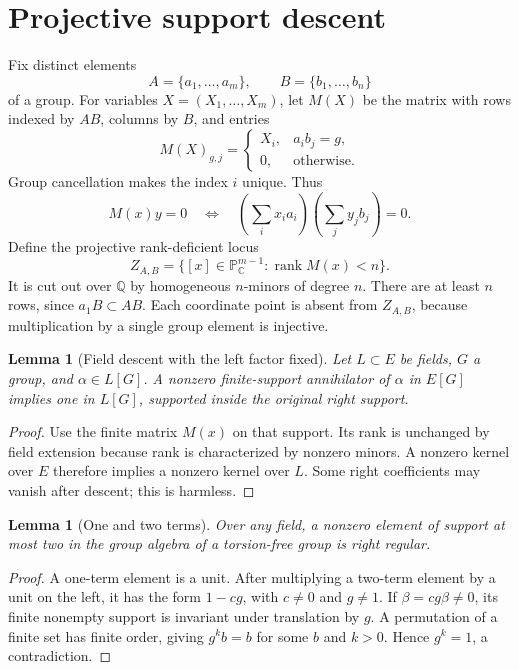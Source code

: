 \documentclass[11pt,a4paper,oneside]{report}
\newtheorem{lemma}[theorem]{Lemma}
\theoremstyle{definition}
\theoremstyle{remark}
\DeclareMathOperator{\rank}{rank}
\newcommand{\C}{\mathbb C}
\newcommand{\Q}{\mathbb Q}
\newcommand{\PP}{\mathbb P}
\begin{document}
\section{Projective support descent}\label{M03:sec:projective}
Fix distinct elements
\[
A=\{a_1,\ldots,a_m\},\qquad B=\{b_1,\ldots,b_n\}
\]
of a group. For variables \(X=(X_1,\ldots,X_m)\), let \(M(X)\) be the matrix with rows indexed by \(AB\), columns by \(B\), and entries
\[
M(X)_{g,j}=\begin{cases}X_i,&a_i b_j=g,\\0,&\text{otherwise}.\end{cases}
\]
Group cancellation makes the index \(i\) unique. Thus
\begin{equation}\label{M03:eq:exactmatrix}
M(x)y=0\quad\Longleftrightarrow\quad
\left(\sum_i x_i a_i\right)\left(\sum_jy_jb_j\right)=0.
\end{equation}
Define the projective rank-deficient locus
\begin{equation}\label{M03:eq:Z}
Z_{A,B}=\{[x]\in\PP^{m-1}_{\C}:\rank M(x)<n\}.
\end{equation}
It is cut out over \(\Q\) by homogeneous \(n\)-minors of degree \(n\). There are at least \(n\) rows, since \(a_1B\subset AB\). Each coordinate point is absent from \(Z_{A,B}\), because multiplication by a single group element is injective.

\begin{lemma}[Field descent with the left factor fixed]\label{M03:lem:descent}
Let \(L\subset E\) be fields, \(G\) a group, and \(\alpha\in L[G]\). A nonzero finite-support annihilator of \(\alpha\) in \(E[G]\) implies one in \(L[G]\), supported inside the original right support.
\end{lemma}
\begin{proof}
Use the finite matrix \(M(x)\) on that support. Its rank is unchanged by field extension because rank is characterized by nonzero minors. A nonzero kernel over \(E\) therefore implies a nonzero kernel over \(L\). Some right coefficients may vanish after descent; this is harmless.
\end{proof}

\begin{lemma}[One and two terms]\label{M03:lem:two}
Over any field, a nonzero element of support at most two in the group algebra of a torsion-free group is right regular.
\end{lemma}
\begin{proof}
A one-term element is a unit. After multiplying a two-term element by a unit on the left, it has the form \(1-cg\), with \(c\ne0\) and \(g\ne1\). If \(\beta=cg\beta\ne0\), its finite nonempty support is invariant under translation by \(g\). A permutation of a finite set has finite order, giving \(g^k b=b\) for some \(b\) and \(k>0\). Hence \(g^k=1\), a contradiction.
\end{proof}
\end{document}
